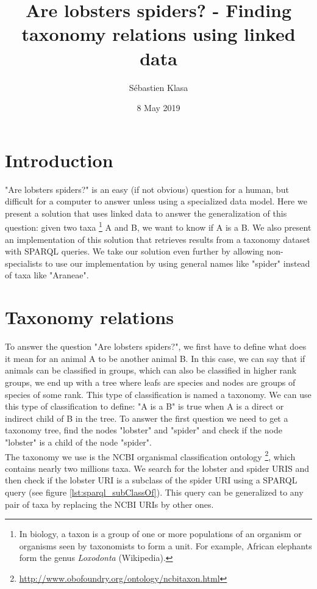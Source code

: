 \documentclass{article}
\title{Are lobsters spiders? - Finding taxonomy relations using linked data}
\author{Sébastien Klasa}
\date{8 May 2019}
\begin{document}
	\maketitle
	
	\section{Introduction}
	
	"Are lobsters spiders?" is an easy (if not obvious) question for a human, but difficult for a computer to answer unless using a specialized data model. Here we present a solution that uses linked data to answer the generalization of this question: given two taxa \footnote{In biology, a taxon is a group of one or more populations of an organism or organisms seen by taxonomists to form a unit. For example, African elephants form the genus \textit{Loxodonta} (Wikipedia).} A and B, we want to know if A is a B. We also present an implementation of this solution that retrieves results from a taxonomy dataset with SPARQL queries. We take our solution even further by allowing non-specialists to use our implementation by using general names like "spider" instead of taxa like "Araneae".
	
	\section{Taxonomy relations}
	\label{sec:taxonomy_relations}
	
	To answer the question "Are lobsters spiders?", we first have to define what does it mean for an animal A to be another animal B. In this case, we can say that if animals can be classified in groups, which can also be classified in higher rank groups, we end up with a tree where leafs are species and nodes are groups of species of some rank. This type of classification is named a taxonomy. We can use this type of classification to define: "A is a B" is true when A is a direct or indirect child of B in the tree. To answer the first question we need to get a taxonomy tree, find the nodes "lobster" and "spider" and check if the node "lobster" is a child of the node "spider".
	\\
	
	The taxonomy we use is the NCBI organismal classification ontology \footnote{\url{http://www.obofoundry.org/ontology/ncbitaxon.html}}, which contains nearly two millions taxa. We search for the lobster and spider URIS and then check if the lobster URI is a subclass of the spider URI using a SPARQL query (see figure \ref{lst:sparql_subClassOf}). This query can be generalized to any pair of taxa by replacing the NCBI URIs by other ones.
	
\end{document}
